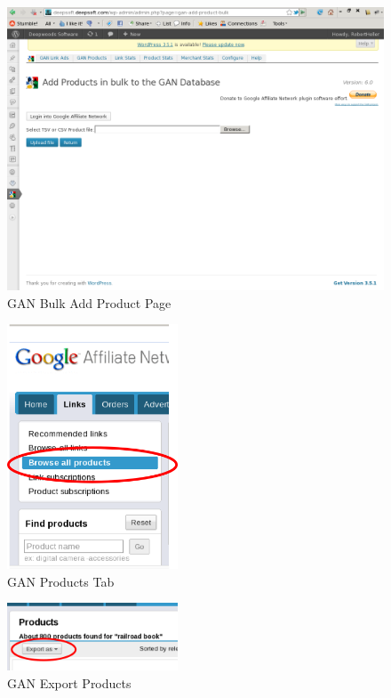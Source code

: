 \documentclass[letterpaper]{article}
\begin{document}
\begin{figure}[ht]
\begin{centering}
\includegraphics[width=4.5in]{ganaddproductbulk.png}
\caption{GAN Bulk Add Product Page}
\label{fig:ganaddproductbulk}
\end{centering}
\end{figure}
\begin{figure}[ht]
\begin{centering}
\includegraphics[width=2in]{ganProductsTab.png}
\caption{GAN Products Tab}
\label{fig:ganProductsTab}
\end{centering}
\end{figure}
\begin{figure}[ht]
\begin{centering}
\includegraphics[width=2in]{ganExportProducts.png}
\caption{GAN Export Products}
\label{fig:ganExportProducts}
\end{centering}
\end{figure}
\end{document}
